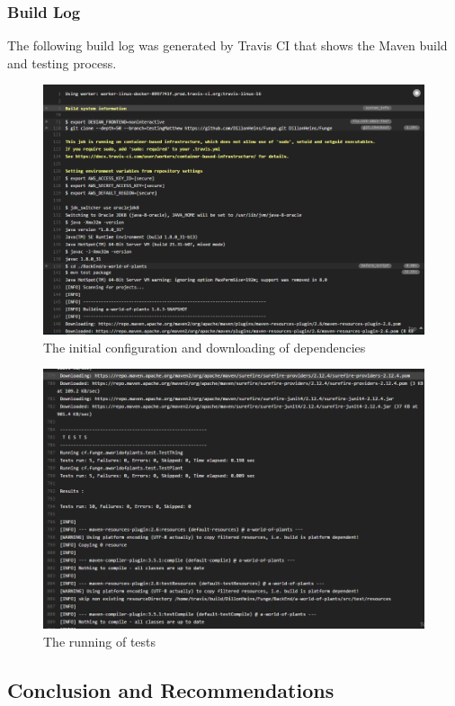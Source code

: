 \documentclass{article}
\begin{document}
		\subsubsection{Build Log}
		The following build log was generated by Travis CI that shows the Maven build and testing process.
		\begin{figure}[H]
			\includegraphics[width=\linewidth]{images/travis1}
			\caption{The initial configuration and downloading of dependencies}
		\end{figure}
		\begin{figure}[H]
			\includegraphics[width=\linewidth]{images/travis2}
			\caption{The running of tests}
		\end{figure}
	\subsection{Conclusion and Recommendations}
		
\end{document}
